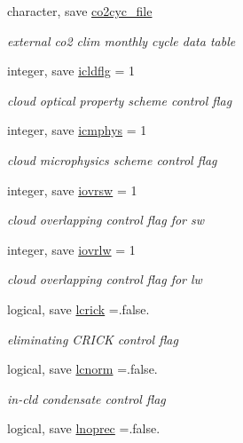 \begin{DoxyCompactItemize}
character, save \hyperlink{namespacephysparam_afe0dc3a936d79b4d7dd58fe29376cb1a}{co2cyc\+\_\+file}
\begin{DoxyCompactList}\small\item\em external co2 clim monthly cycle data table \end{DoxyCompactList}\item 
integer, save \hyperlink{namespacephysparam_aaba5cffa32ce34374f15cb09e21ab973}{icldflg} = 1
\begin{DoxyCompactList}\small\item\em cloud optical property scheme control flag \end{DoxyCompactList}\item 
integer, save \hyperlink{namespacephysparam_af259ebea0c378b3b07343141977db03e}{icmphys} = 1
\begin{DoxyCompactList}\small\item\em cloud microphysics scheme control flag \end{DoxyCompactList}\item 
integer, save \hyperlink{namespacephysparam_a2f0c4c2c8f4a93048ab2b84826498007}{iovrsw} = 1
\begin{DoxyCompactList}\small\item\em cloud overlapping control flag for sw \end{DoxyCompactList}\item 
integer, save \hyperlink{namespacephysparam_a644d850cdfb6dd159e51223f715683f6}{iovrlw} = 1
\begin{DoxyCompactList}\small\item\em cloud overlapping control flag for lw \end{DoxyCompactList}\item 
logical, save \hyperlink{namespacephysparam_a3506e1f83500ea78568ab697f55cadb4}{lcrick} =.false.
\begin{DoxyCompactList}\small\item\em eliminating C\+R\+I\+CK control flag \end{DoxyCompactList}\item 
logical, save \hyperlink{namespacephysparam_ae5b7bb287e8a1f935cf135ffeaadca7a}{lcnorm} =.false.
\begin{DoxyCompactList}\small\item\em in-\/cld condensate control flag \end{DoxyCompactList}\item 
logical, save \hyperlink{namespacephysparam_acb52e2553c9e106bd8885fd09c6e2dd2}{lnoprec} =.false.

\end{DoxyCompactItemize}
